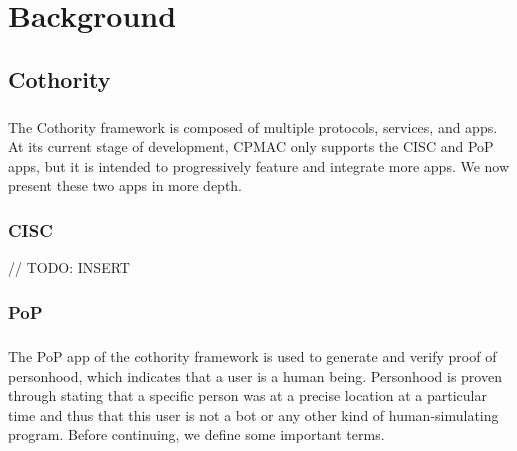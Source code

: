 \chapter{Background}
\section{Cothority}

\paragraph{}
The Cothority framework is composed of multiple protocols, services, and apps. At its current stage of development, CPMAC only supports the CISC and PoP apps, but it is intended to progressively feature and integrate more apps. We now present these two apps in more depth.

\subsection{CISC}

// TODO: INSERT

\subsection{PoP}

\paragraph{}
The PoP app of the cothority framework is used to generate and verify proof of personhood, which indicates that a user is a human being. Personhood is proven through stating that a specific person was at a precise location at a particular time and thus that this user is not a bot or any other kind of human-simulating program. Before continuing, we define some important terms.

